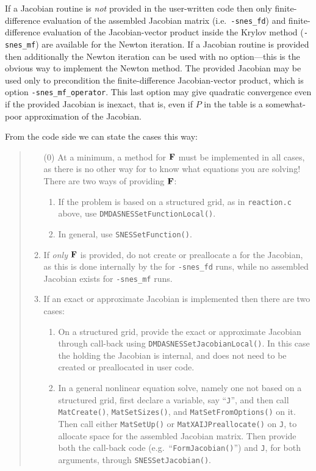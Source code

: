 If a Jacobian routine is \emph{not} provided in the user-written code then only finite-difference evaluation of the assembled Jacobian matrix (i.e.~\texttt{-snes\_fd}) and finite-difference evaluation of the Jacobian-vector product inside the Krylov method (\texttt{-snes\_mf}) are available for the Newton iteration.  If a Jacobian routine is provided then additionally the Newton iteration can be used with no option---this is the obvious way to implement the Newton method.  The provided Jacobian may be used only to precondition the finite-difference Jacobian-vector product, which is option \texttt{-snes\_mf\_operator}.  This last option may give quadratic convergence even if the provided Jacobian is inexact, that is, even if $P$ in the table is a somewhat-poor approximation of the Jacobian.

From the code side we can state the cases this way:
\begin{quote}
\renewcommand{\labelenumi}{(\roman{enumi})}
\begin{enumerate}
\item[($0$)] At a minimum, a method for $\mathbf{F}$ must be implemented in all cases, as there is no other way for \PETSc to know what equations you are solving!  There are two ways of providing $\mathbf{F}$:
  \renewcommand{\labelenumii}{\alph{enumii}.}
   \begin{enumerate}
   \item If the problem is based on a structured grid, as in \texttt{reaction.c} above, use \texttt{DMDASNESSetFunctionLocal()}.
   \item In general, use \texttt{SNESSetFunction()}.
   \end{enumerate}
\item If \emph{only} $\mathbf{F}$ is provided, do not create or preallocate a \pMat for the Jacobian, as this is done internally by the \pSNES for \texttt{-snes\_fd} runs, while no assembled Jacobian \pMat exists for \texttt{-snes\_mf} runs.
\item If an exact or approximate Jacobian is implemented then there are two cases:
   \renewcommand{\labelenumii}{\alph{enumii}.}
   \begin{enumerate}
   \item On a structured grid, provide the exact or approximate Jacobian through call-back using \texttt{DMDASNESSetJacobianLocal()}.  In this case the \pMat holding the Jacobian is internal, and does not need to be created or preallocated in user code.
   \item In a general nonlinear equation solve, namely one not based on a structured grid, first declare a \pMat variable, say ``\texttt{J}'', and then call \texttt{MatCreate()}, \texttt{MatSetSizes()}, and \texttt{MatSetFromOptions()} on it.  Then call either \texttt{MatSetUp()} or \texttt{MatXAIJPreallocate()} on \texttt{J}, to allocate space for the assembled Jacobian matrix.  Then provide both the call-back code (e.g.~``\texttt{FormJacobian()}'') and \texttt{J}, for both \pMat arguments, through \texttt{SNESSetJacobian()}.
   \end{enumerate}
\end{enumerate}
\end{quote}

